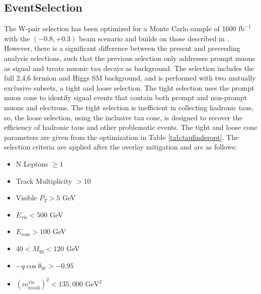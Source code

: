 \subsection{EventSelection}
\label{subsec:EventSelection}
The W-pair selection has been optimized for a Monte Carlo sample of 1600 $\text{fb}^{-1}$ with the $(-0.8,+0.3)$ beam scenario and builds on those described in \cite{ivan}. However, there is a significant difference between the present and preceeding analysis selections, such that  the previous selection only addresses prompt muons as signal and treats muonic tau decays as background. The selection includes the full 2,4,6 fermion and Higgs SM background, and is performed with two mutually exclusive subsets, a tight and loose selection. The tight selection uses the prompt muon cone to identify signal events that contain both prompt and non-prompt muons and electrons. The tight selection is inefficient in collecting hadronic taus, so, the loose selection, using the inclusive tau cone, is designed to recover the efficiency of hadronic taus and other problematic events. The tight and loose cone parameters are given from the optimization in Table \ref{tab:taufinderopt}. \pagebreak[4] The selection criteria are applied after the overlay mitigation and are as follows:
\begin{itemize}
\item N Leptons $\geq 1$
\item Track Multiplicity $> 10$  
\item Visible $P_T > 5$ GeV  
\item $E_{\text{vis}} < 500$ GeV 
\item $E_{\text{com}} > 100$ GeV
\item $40<M_{qq}<120$ GeV
\item  $-q\cos\theta_W > -0.95$
\item  $(m^{\text{vis}}_{\text{recoil}})^2 < 135,000 \, \, \text{GeV}^2$
\end{itemize}

